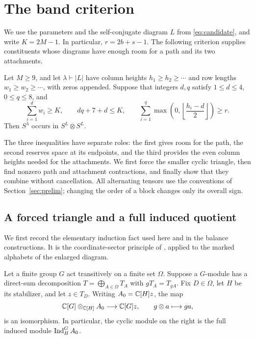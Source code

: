 \section{The band criterion}
\label{sec:band}

We use the parameters and the self-conjugate diagram $L$ from
\eqref{eq:candidate}, and write $K=2M-1$.  In particular,
$r=2b+s-1$.  The following criterion supplies constituents whose
diagrams have enough room for a path and its two attachments.

\begin{proposition}\label{prop:band-test}
Let $M\ge9$, and let $\lambda\vdash |L|$ have column heights
$h_1\ge h_2\ge\cdots$ and row lengths $w_1\ge w_2\ge\cdots$,
with zeros appended.  Suppose that integers $d,q$ satisfy
$1\le d\le4$, $0\le q\le8$, and
\begin{equation}\label{eq:band-criterion}
 \sum_{i=1}^d w_i\ge K,\qquad
 dq+7+d\le K,\qquad
 \sum_{i=1}^q
      \max\left(0,\left\lfloor\frac{h_i-d}{2}\right\rfloor\right)
       \ge r.
\end{equation}
Then $S^\lambda$ occurs in $S^L\otimes S^L$.
\end{proposition}

The three inequalities have separate roles: the first gives room for
the path, the second reserves space at its endpoints, and the third
provides the even column heights needed for the attachments. We first
force the smaller cyclic triangle, then find nonzero path and attachment
contractions, and finally show that they combine without cancellation.
All alternating tensors use the conventions of
Section~\ref{sec:prelim}; changing the order of a block changes only its
overall sign.

\subsection{A forced triangle and a full induced quotient}

We first record the elementary induction fact used here and in the
balance constructions. It is the coordinate-sector principle of
\cite[Section~4]{SaxlCyclic}, applied to the marked alphabets of the
enlarged diagram.

\begin{lemma}
\label{lem:sector-induction}
Let a finite group $G$ act transitively on a finite set $\Omega$.
Suppose a $G$-module has a direct-sum decomposition
$T=\bigoplus_{A\in\Omega}T_A$ with $gT_A=T_{gA}$.
Fix $D\in\Omega$, let $H$ be its stabilizer, and let $z\in T_D$.
Writing $A_0=\mathbb C[H]z$, the map
\[
 \mathbb C[G]\otimes_{\mathbb C[H]}A_0\longrightarrow\mathbb C[G]z,
 \qquad g\otimes a\longmapsto ga,
\]
is an isomorphism.  In particular, the cyclic module on the right is
the full induced module $\operatorname{Ind}_H^G A_0$.
\end{lemma}

